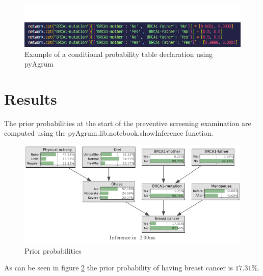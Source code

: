 \documentclass{article}
\begin{document}
\begin{figure}[H]
    \centering
    \includegraphics[width=\textwidth]{../figures/cpt_declaration.png}
    \caption{Example of a conditional probability table declaration using pyAgrum}
    \label{fig:cpt_declaration}
\end{figure}

\section{Results}
The prior probabilities at the start of the preventive screening examination are computed using the pyAgrum.lib.notebook.showInference function.
\begin{figure}[H]
    \centering
    \includegraphics[width=\textwidth]{../figures/priors.png}
    \caption{Prior probabilities}
    \label{fig:priors}
\end{figure}
As can be seen in figure \ref{fig:priors} the prior probability of having breast cancer is $17.31\%$.
\end{document}
